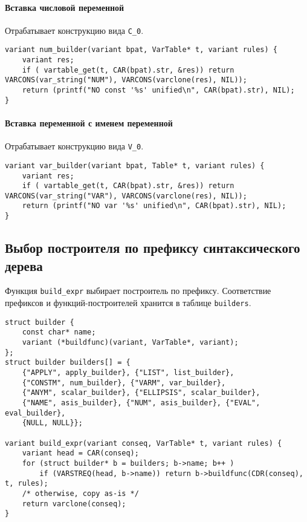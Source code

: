 \documentclass[10pt]{report}
\begin{document}
\paragraph{Вставка числовой переменной} Отрабатывает конструкцию вида \verb|C_0|. 
\begin{lstlisting}[firstnumber=77]
variant num_builder(variant bpat, VarTable* t, variant rules) {
	variant res;
	if ( vartable_get(t, CAR(bpat).str, &res)) return VARCONS(var_string("NUM"), VARCONS(varclone(res), NIL));
	return (printf("NO const '%s' unified\n", CAR(bpat).str), NIL);
}
\end{lstlisting}
\paragraph{Вставка переменной с именем переменной} Отрабатывает конструкцию вида \verb|V_0|.
\begin{lstlisting}[firstnumber=83]
variant var_builder(variant bpat, Table* t, variant rules) {
	variant res;
	if ( vartable_get(t, CAR(bpat).str, &res)) return VARCONS(var_string("VAR"), VARCONS(varclone(res), NIL));
	return (printf("NO var '%s' unified\n", CAR(bpat).str), NIL);
}
\end{lstlisting}
\subsection{Выбор построителя по префиксу синтаксического дерева}
Функция \texttt{build\_expr} выбирает построитель по префиксу. 
Соответствие префиксов и функций-построителей хранится в таблице \texttt{builders}.
\begin{lstlisting}[firstnumber=89]
struct builder {
	const char* name;
	variant (*buildfunc)(variant, VarTable*, variant);
};
struct builder builders[] = {
	{"APPLY", apply_builder}, {"LIST", list_builder},
	{"CONSTM", num_builder}, {"VARM", var_builder},
	{"ANYM", scalar_builder}, {"ELLIPSIS", scalar_builder},
	{"NAME", asis_builder}, {"NUM", asis_builder}, {"EVAL", eval_builder},
	{NULL, NULL}};

variant build_expr(variant conseq, VarTable* t, variant rules) {
	variant head = CAR(conseq);
	for (struct builder* b = builders; b->name; b++ ) 
		if (VARSTREQ(head, b->name)) return b->buildfunc(CDR(conseq), t, rules);
	/* otherwise, copy as-is */
	return varclone(conseq);
}

\end{lstlisting}
\end{document}
